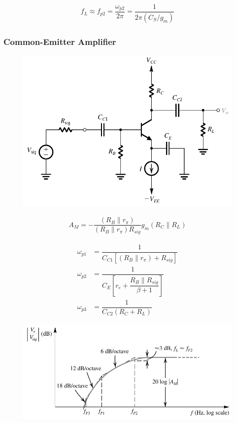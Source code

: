 \begin{equation*}
  \begin{aligned}
    f_L \approx f_{p2} = \dfrac{\omega_{p2}}{2 \pi} = \dfrac{1}{2 \pi \left( C_S / g_m  \right)} 
  \end{aligned}
\end{equation*}

\subsubsection{Common-Emitter Amplifier}

\begin{figure}[H]
  \centering
  \includegraphics[width=0.4\linewidth]{figures/Frequency-Response-CE}
\end{figure}

\begin{equation*}
  \begin{aligned}
    A_M = - \dfrac{\left( R_B \parallel r_{\pi} \right)}{\left( R_B \parallel r_{\pi} \right) R_{sig} } g_m \left( R_C \parallel R_L \right) 
  \end{aligned}
\end{equation*}

\begin{equation*}
  \begin{aligned}
    \omega_{p1} &= \dfrac{1}{C_{C1} \left[ \left( R_B \parallel r_{\pi} \right) + R_{sig} \right]} \\
    \omega_{p2} &= \dfrac{1}{C_E \left[ r_e + \dfrac{R_B \parallel R_{sig}}{\beta + 1}  \right]} \\
    \omega_{p3} &= \dfrac{1}{C_{C2} \left( R_C + R_L \right)} 
  \end{aligned}
\end{equation*}

\begin{figure}[H]
  \centering
  \includegraphics[width=0.5\linewidth]{figures/Frequency-Response-CE-freq}
\end{figure}

